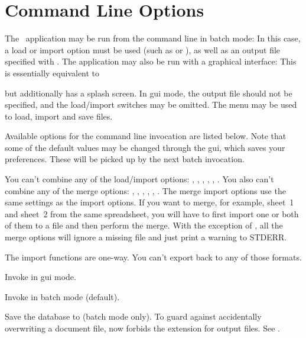 \chapter{Command Line Options}
\label{sec:commandoptions}

The \appname\ application may be run from the command line in batch
mode:
In this case, a load or import option must be used (such as
 or ), as well as an output file specified
with . The application may also be run with a
graphical interface:
This is essentially equivalent to
\begin{terminal}
  
\end{terminal}
but additionally has a splash screen. In \gls{gui} mode, the output
file should not be specified, and the load\slash import switches may
be omitted. The  menu may be used to load, import and
save files.

Available options for the command line invocation are listed below.
Note that some of the default values may be changed through the
\gls{gui}, which saves your preferences.  These will be picked up by
the next batch invocation.

You can't combine any of the load/import options: ,
, , , ,
. You also can't combine any of the merge options:
, , ,
, , .
The merge import options use the same settings as the import
options. If you want to merge, for example, sheet~1 and sheet~2 from
the same spreadsheet, you will have to first import one or both of
them to a  file and then perform the merge.  With the
exception of , all the merge options will ignore a
missing file and just print a warning to STDERR.

The import functions are one-way. You can't export back to any of 
those formats.

Invoke  in \gls{gui} mode.

Invoke  in batch mode (default).

Save the database to  (batch mode only).
To guard against accidentally overwriting a document file, 
now forbids the  extension for output files. See
.

